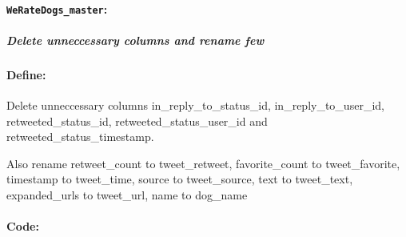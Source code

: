 \documentclass[11pt]{article}
\begin{document}
    \hypertarget{weratedogs_master}{%
\paragraph{\texorpdfstring{\texttt{WeRateDogs\_master}:}{WeRateDogs\_master:}}\label{weratedogs_master}}

\hypertarget{delete-unneccessary-columns-and-rename-few}{%
\subparagraph{Delete unneccessary columns and rename
few}\label{delete-unneccessary-columns-and-rename-few}}

\hypertarget{define}{%
\paragraph{Define:}\label{define}}

Delete unneccessary columns in\_reply\_to\_status\_id,
in\_reply\_to\_user\_id, retweeted\_status\_id,
retweeted\_status\_user\_id and retweeted\_status\_timestamp.

Also rename retweet\_count to tweet\_retweet, favorite\_count to
tweet\_favorite, timestamp to tweet\_time, source to tweet\_source, text
to tweet\_text, expanded\_urls to tweet\_url, name to dog\_name

\hypertarget{code}{%
\paragraph{Code:}\label{code}}
\end{document}
